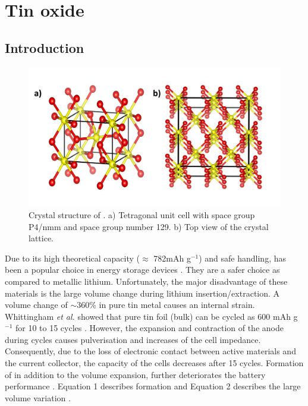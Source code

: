 \section{Tin oxide}

\subsection{Introduction}

\begin{figure}[th!]
  \centering
  \includegraphics[width=\textwidth]{Figures/chap6fig/SnO2crys}
    \caption{Crystal structure of . a) Tetragonal unit cell with space group P4/nmm and space group number 129. b) Top view of the crystal lattice.}
  \label{Figures/chap6fig:SnO2crys}
  \end{figure}
  
Due to its high theoretical capacity ($\approx$ 782mAh g$^{-1}$) and safe handling,  has been a popular choice in energy storage devices  \cite{idota_tin-based_1997}. They are a safer choice as compared to metallic lithium. Unfortunately, the major disadvantage of these materials is the large volume change during lithium insertion/extraction. A volume change of $\sim$360\% in pure tin metal causes an internal strain. Whittingham \textit{et al.} showed that pure tin foil (bulk) can be cycled as 600 mAh g$^{-1}$ for 10 to 15 cycles \cite{yang_anodes_2003}. However, the expansion and contraction of the anode during cycles causes pulverisation and increases of the cell impedance. Consequently, due to the loss of electronic contact between active materials and the current collector, the capacity of the cells decreases after 15 cycles. Formation of  in addition to the volume expansion, further deteriorates the battery performance \cite{zhao_tin-based_2016}. Equation 1 describes  formation and Equation 2 describes the large volume variation \cite{park_effect_2008}.

